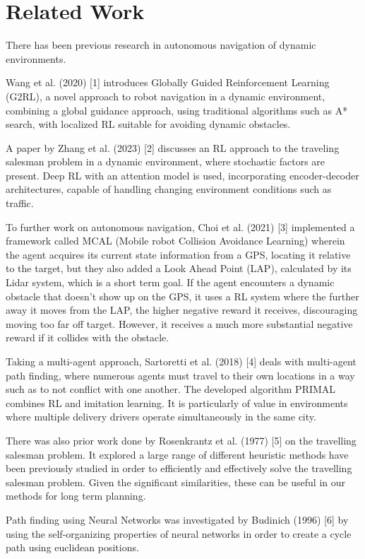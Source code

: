 \documentclass{article}
\begin{document}
	\section{Related Work}
	
	There has been previous research in autonomous navigation of dynamic environments. 
	
	Wang et al. (2020) [1] introduces Globally Guided Reinforcement Learning (G2RL), a novel approach to robot navigation in a dynamic environment, combining a global guidance approach, using traditional algorithms such as A* search, with localized RL suitable for avoiding dynamic obstacles.
	
	A paper by Zhang et al. (2023) [2] discusses an RL approach to the traveling salesman problem in a dynamic environment, where stochastic factors are present. Deep RL with an attention model is used, incorporating encoder-decoder architectures, capable of handling changing environment conditions such as traffic. 
	
	To further work on autonomous navigation, Choi et al. (2021) [3] implemented a framework called MCAL (Mobile robot Collision Avoidance Learning) wherein the agent acquires its current state information from a GPS, locating it relative to the target, but they also added a Look Ahead Point (LAP), calculated by its Lidar system, which is a short term goal. If the agent encounters a dynamic obstacle that doesn’t show up on the GPS, it uses a RL system where the further away it moves from the LAP, the higher negative reward it receives, discouraging moving too far off target. However, it receives a much more substantial negative reward if it collides with the obstacle.
	
	Taking a multi-agent approach, Sartoretti et al. (2018) [4] deals with multi-agent path finding, where numerous agents must travel to their own locations in a way such as to not conflict with one another. The developed algorithm PRIMAL combines RL and imitation learning. It is particularly of value in environments where multiple delivery drivers operate simultaneously in the same city.
	
	There was also prior work done by Rosenkrantz et al. (1977) [5] on the travelling salesman problem. It explored a large range of different heuristic methods have been previously studied in order to efficiently and effectively solve the travelling salesman problem. Given the significant similarities, these can be useful in our methods for long term planning.
	
	Path finding using Neural Networks was investigated by Budinich (1996) [6] by using the self-organizing properties of neural networks in order to create a cycle path using euclidean positions.
	
\end{document}
